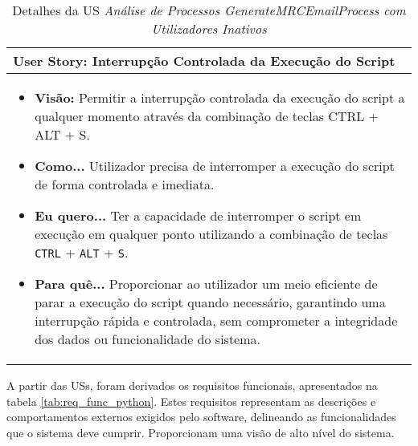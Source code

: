                 \begin{table}[htbp] %
                    \centering
                    \caption{Detalhes da US \textit{Análise de Processos GenerateMRCEmailProcess com Utilizadores Inativos}}\label{table:python_us4}
                    \begin{tabularx}{1\textwidth}{|>{\raggedright\arraybackslash}X|}
                        \hline
                        \rowcolor{lightgray}
                        \textbf{User Story:} Interrupção Controlada da Execução do Script \\
                        \hline
                        \rowcolor{lightgray!20}
                                        
                        \begin{itemize}
                            \item \textbf{Visão:} Permitir a interrupção controlada da execução do script a qualquer momento através da combinação de teclas CTRL + ALT + S.

                            \item \textbf{Como...} Utilizador precisa de interromper a execução do script de forma controlada e imediata.

                            \item \textbf{Eu quero...} Ter a capacidade de interromper o script em execução em qualquer ponto utilizando a combinação de teclas \texttt{CTRL} + \texttt{ALT} + \texttt{S}.

                            \item \textbf{Para quê...} Proporcionar ao utilizador um meio eficiente de parar a execução do script quando necessário, garantindo uma interrupção rápida e controlada, sem comprometer a integridade dos dados ou funcionalidade do sistema.
                        \end{itemize}
                        \\
                        \hline
                    \end{tabularx}
                \end{table}

            \label{secsecsec:req_func_python}

                A partir das USs, foram derivados os requisitos funcionais, apresentados na tabela \ref{tab:req_func_python}. Estes requisitos representam as descrições e comportamentos externos exigidos pelo software, delineando as funcionalidades que o sistema deve cumprir. Proporcionam uma visão de alto nível do sistema.
                
